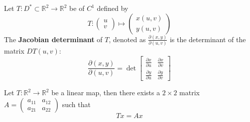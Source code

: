 \documentclass[openany]{book}
\newcommand{\R}{\mathbb{R}}
\begin{document}
\begin{defn}
    Let $T:D^*\subset\R^2\to\R^2$ be of $C^1$ defined by 
    \begin{equation*}
        T:\begin{pmatrix}
            u\\
            v
        \end{pmatrix}\mapsto \begin{pmatrix}
            x(u,v)\\
            y(u,v)
        \end{pmatrix}
    \end{equation*}
    The \textbf{Jacobian determinant} of $T$, denoted as $\frac{\partial(x,y)}{\partial(u,v)}$ is the determinant of the matrix $DT(u,v)$:
    \begin{equation*}
        \frac{\partial(x,y)}{\partial(u,v)}=\det\begin{bmatrix}
            \frac{\partial x}{\partial u}& \frac{\partial x}{\partial v}\\
            \frac{\partial y}{\partial u}&\frac{\partial y}{\partial v}
        \end{bmatrix}
    \end{equation*}
\end{defn}





\begin{prop}
    Let $T:\R^2\to\R^2$ be a linear map, then there exists a $2\times 2$ matrix $A=\begin{pmatrix}
        a_{11}&a_{12}\\
        a_{21}&a_{22}
    \end{pmatrix}$ such that 
    \begin{equation*}
        Tx=Ax
    \end{equation*}
\end{prop}
\end{document}
